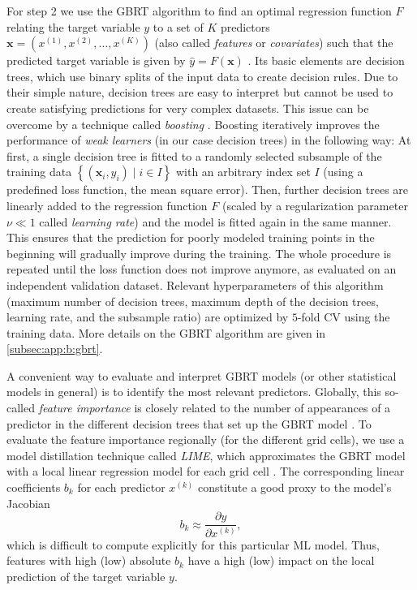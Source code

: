 For step 2 we use the \ac{GBRT} algorithm to find an optimal regression
function $F$ relating the target variable $y$ to a set of $K$ predictors
$\bm{x} = \left( x^{(1)}, x^{(2)}, \ldots, x^{(K)} \right)$ (also called
\emph{features} or \emph{covariates}) such that the predicted target variable
is given by $\hat{y} = F(\bm{x})$ \autocite{Death2007, Elith2008, Friedman2001,
  Friedman2002}. Its basic elements are decision trees, which use binary splits
of the input data to create decision rules. Due to their simple nature,
decision trees are easy to interpret but cannot be used to create satisfying
predictions for very complex datasets. This issue can be overcome by a
technique called \emph{boosting} \autocite{Freund1996}. Boosting iteratively
improves the performance of \emph{weak learners} (in our case decision trees)
in the following way: At first, a single decision tree is fitted to a randomly
selected subsample of the training data $\left\{ \left( \bm{x}_i, y_i \right)
\mid i \in I \right\}$ with an arbitrary index set $I$ (using a predefined loss
function, \eg{} the mean square error). Then, further decision trees are
linearly added to the regression function $F$ (scaled by a regularization
parameter $\nu \ll 1$ called \emph{learning rate}) and the model is fitted
again in the same manner. This ensures that the prediction for poorly modeled
training points in the beginning will gradually improve during the training.
The whole procedure is repeated until the loss function does not improve
anymore, as evaluated on an independent validation dataset. Relevant
hyperparameters of this algorithm (maximum number of decision trees, maximum
depth of the decision trees, learning rate, and the subsample ratio) are
optimized by $5$-fold \acf{CV} using the training data. More details on the
\ac{GBRT} algorithm are given in \cref{subsec:app:b:gbrt}.

A convenient way to evaluate and interpret \ac{GBRT} models (or other
statistical models in general) is to identify the most relevant predictors.
Globally, this so-called \emph{feature importance} is closely related to the
number of appearances of a predictor in the different decision trees that set
up the \ac{GBRT} model \autocite{Friedman2001}. To evaluate the feature
importance regionally (for the different grid cells), we use a model
distillation technique called \emph{\ac{LIME}}, which approximates the
\ac{GBRT} model with a local linear regression model for each grid cell
\autocite{Ribeiro2016}. The corresponding linear coefficients $b_k$ for each
predictor $x^{(k)}$ constitute a good proxy to the model's Jacobian
\begin{equation}
  b_k \approx \frac{\partial y}{\partial x^{(k)}},
  \label{eq:06:jacobian}
\end{equation}
which is difficult to compute explicitly for this particular \ac{ML} model.
Thus, features with high (low) absolute $b_k$ have a high (low) impact on the
local prediction of the target variable $y$.

